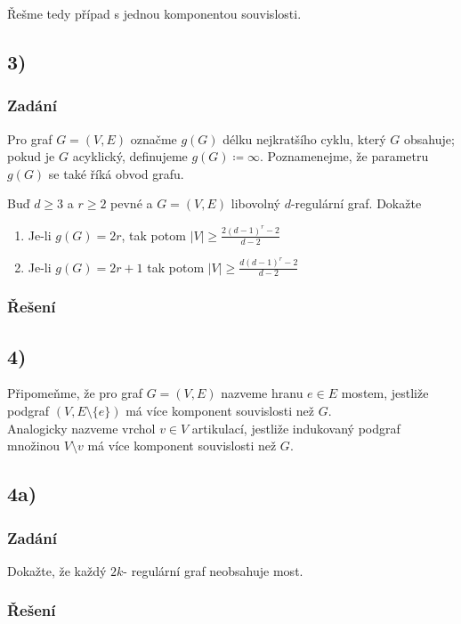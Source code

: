 \documentclass[../main.tex]{subfiles}
\begin{document}
Řešme tedy případ s jednou komponentou souvislosti.





\subsection{3)}
\subsubsection*{Zadání}
Pro graf $G=(V,E)$ označme $g(G)$ délku nejkratšího cyklu, který $G$ obsahuje; pokud je $G$ acyklický, definujeme $g(G)\coloneq \infty$.
Poznamenejme, že parametru $g(G)$ se také říká obvod grafu.

Buď $d\geq 3$ a $r\geq 2$ pevné a $G=(V,E)$ libovolný $d$-regulární graf. Dokažte
\begin{enumerate}
    \item Je-li $g(G)=2r$, tak  potom $|V| \geq \frac{2(d-1)^r -2}{d-2}$
    \item Je-li $g(G) = 2r + 1$ tak potom $|V|\geq \frac{d(d-1)^r -2}{d-2}$
\end{enumerate}

\subsubsection*{Řešení}


\subsection{4)}
Připomeňme, že pro graf $G=(V,E)$ nazveme hranu $e\in E$ mostem, jestliže podgraf $(V,E\setminus\{e\})$ má více komponent souvislosti než $G$.\\
Analogicky nazveme vrchol $v\in V$ artikulací, jestliže indukovaný podgraf množinou $V\setminus{v}$ má více komponent souvislosti než $G$.

\subsection{4a)}
\subsubsection*{Zadání}
Dokažte, že každý $2k$- regulární graf neobsahuje most.
\subsubsection*{Řešení}
\end{document}
